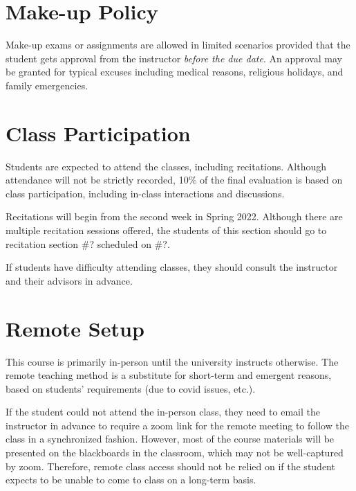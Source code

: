 \documentclass[letterpaper]{inzane_syllabus} %
\begin{document}
\vspace{0.5cm}
\section{Make-up Policy}
Make-up exams or assignments are allowed in limited scenarios provided that the student gets approval from the instructor \emph{before the due date}. An approval may be granted for typical excuses including medical reasons, religious holidays, and family emergencies.

\vspace{0.5cm}
\section{Class Participation}
Students are expected to attend the classes, including recitations. Although attendance will not be strictly recorded, 10\% of the final evaluation is based on class participation, including in-class interactions and discussions. 

Recitations will begin from the second week in Spring 2022. Although there are multiple recitation sessions offered, the students of this section should go to recitation section \#? scheduled on \#?. 

If students have difficulty attending classes, they should consult the instructor and their advisors in advance.

\vspace{0.5cm}
\section{Remote Setup}
This course is primarily in-person until the university instructs otherwise. The remote teaching method is a substitute for short-term and emergent reasons, based on students' requirements (due to covid issues, etc.). 

If the student could not attend the in-person class, they need to email the instructor in advance to require a zoom link for the remote meeting to follow the class in a synchronized fashion. However, most of the course materials will be presented on the blackboards in the classroom, which may not be well-captured by zoom. Therefore, remote class access should not be relied on if the student expects to be unable to come to class on a long-term basis.

\vspace{0.5cm}
\end{document}
